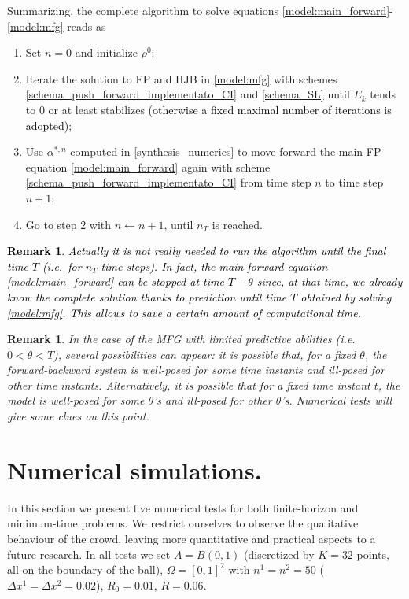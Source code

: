 \documentclass{cmslatex}
\newcommand{\Dx}{\Delta x^1}
\newcommand{\Dy}{\Delta x^2}
\newcommand{\REV}[1]{\textcolor{black}{#1}}
\newtheorem{rem}[thm]{Remark}
\begin{document}
\medskip

Summarizing, the complete algorithm to solve equations \eqref{model:main_forward}-\eqref{model:mfg} reads as
\begin{enumerate}
	\item Set $n=0$ and initialize $\rho^0$;
	\item Iterate the solution to FP and HJB in \eqref{model:mfg} with schemes \eqref{schema_push_forward_implementato_CI} and \eqref{schema_SL} until $E_k$ tends to 0 or at least stabilizes \REV{(otherwise a fixed maximal number of iterations is adopted)};
	\item Use $\alpha^{*,n}$ computed in \eqref{synthesis_numerics} to move forward the main FP equation \eqref{model:main_forward} again with scheme \eqref{schema_push_forward_implementato_CI} from time step $n$ to time step $n+1$;
	\item Go to step 2 with $n\leftarrow n+1$, until $n_T$ is reached.
\end{enumerate}

\medskip

\REV{\begin{rem}\label{rem:numericaltrick}
	Actually it is not really needed to run the algorithm until the final time $T$ (i.e.\ for $n_T$ time steps).
	In fact, the main forward equation \eqref{model:main_forward} can be stopped at time $T-\theta$ since, at that time, we already know the complete solution thanks to prediction until time $T$ obtained by solving \eqref{model:mfg}. This allows to save a certain amount of computational time.
\end{rem}}

\begin{rem}
	In the case of the MFG with limited predictive abilities (i.e.\ $0<\theta<T$), several possibilities can appear: 
	it is possible that, for a fixed $\theta$,  the forward-backward system is well-posed for some time instants and ill-posed for other time instants. 
	Alternatively, it is possible that for a fixed time instant $t$,  the model is well-posed for some $\theta$'s and ill-posed for other $\theta$'s. 
	Numerical tests will give some clues on this point.
\end{rem}

%
%
%
%
%
%
%
%
%
\section{Numerical simulations.}\label{sec:tests}	
In this section we present five numerical tests for both finite-horizon and minimum-time problems.
We restrict ourselves to observe the qualitative behaviour of the crowd, leaving more quantitative and practical aspects to a future research.
In all tests we set $A=B(0,1)$ (discretized by $K=32$ points, all on the boundary of the ball), $\Omega=[0,1]^2$ with $n^1=n^2=50$ ($\Dx=\Dy=0.02$), $R_0=0.01$, $R=0.06$.
%
%
%
%
\end{document}

